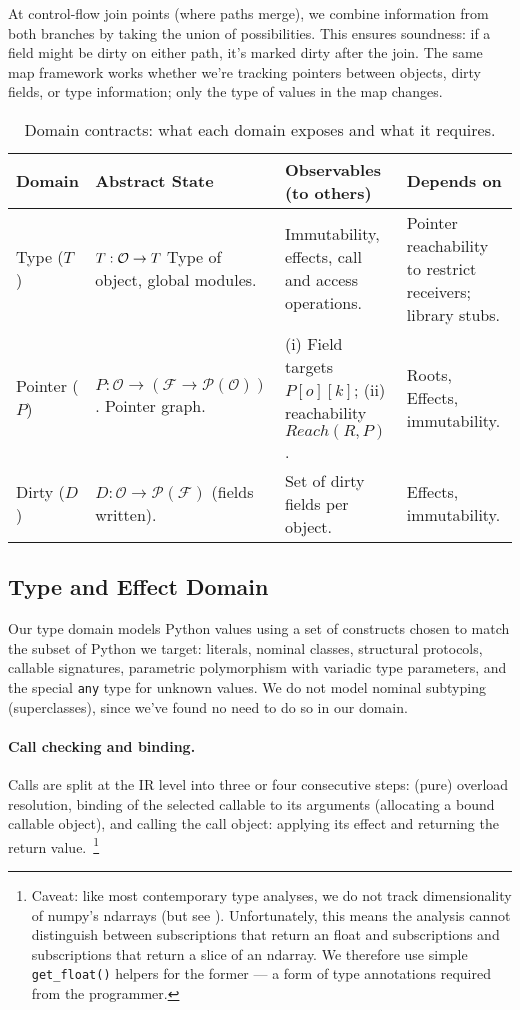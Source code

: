 At control-flow join points (where paths merge), we combine information from both branches by taking the union of possibilities. This ensures soundness: if a field might be dirty on either path, it's marked dirty after the join. The same map framework works whether we're tracking pointers between objects, dirty fields, or type information; only the type of values in the map changes.

\begin{table}[t]
\centering
\small
\begin{tabular}{p{15mm}p{36mm}p{37mm}p{40mm}}
\toprule
\textbf{Domain} & \textbf{Abstract State} & \textbf{Observables (to others)} & \textbf{Depends on} \\
\midrule
Type ($T$) &
  $T:\mathcal O\to \mathcal \mathcal{T}$
  Type of object, global modules. &
  Immutability, effects, call and access operations. &
  Pointer reachability to restrict receivers; library stubs. \\
\addlinespace
Pointer ($P$) &
  $P:\mathcal O\to(\mathcal F\to \mathcal P(\mathcal O))$.
  Pointer graph.&
  (i) Field targets $P[o][k]$; (ii) reachability $Reach(R,P)$. &
  Roots, Effects, immutability. \\
\addlinespace
Dirty ($D$) &
  $D:\mathcal O\to \mathcal P(\mathcal F)$ (fields written). &
  Set of dirty fields per object. &
  Effects,  immutability. \\
\bottomrule
\end{tabular}
\caption{Domain contracts: what each domain exposes and what it requires.}
\label{tab:contracts}
\end{table}

\subsection{Type and Effect Domain}
Our type domain models Python values using a set of constructs chosen to match the subset of Python we target: literals, nominal classes, structural protocols, callable signatures, parametric polymorphism with variadic type parameters, and the special \texttt{any} type for unknown values. We do not model nominal subtyping (superclasses), since we've found no need to do so in our domain.

\paragraph{Call checking and binding.}
Calls are split at the IR level into three or four consecutive steps: (pure) overload resolution, binding of the selected callable to its arguments (allocating a bound callable object), and calling the call object: applying its effect and returning the return value.~\footnote{Caveat: like most contemporary type analyses, we do not track dimensionality of numpy's ndarrays (but see \cite{liu2020type}). Unfortunately, this means the analysis cannot distinguish between subscriptions that return an float and subscriptions and subscriptions that return a slice of an ndarray. We therefore use simple \texttt{get\_float()} helpers for the former --- a form of type annotations required from the programmer.}

